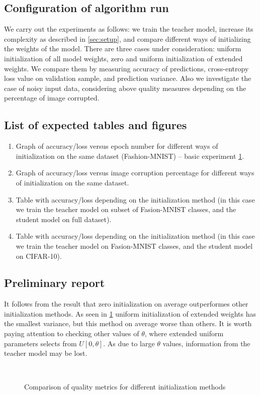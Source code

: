 \documentclass[80pt]{article}
\begin{document}
\subsection{Configuration of algorithm run}

We carry out the experiments as follows: we train the teacher model, increase its complexity as described in \autoref{sec:setup}, and compare different ways of initializing the weights of the model. There are three cases under consideration: uniform initialization of all model weights, zero and uniform initialization of extended weights. We compare them by measuring accuracy of predictions, cross-entropy loss value on validation sample, and prediction variance. Also we investigate the case of noisy input data, considering above quality measures depending on the percentage of image corrupted.

\subsection{List of expected tables and figures}

\begin{enumerate}
    \item Graph of accuracy/loss versus epoch number for different ways of initialization on the same dataset (Fashion-MNIST) -- basic experiment \ref{fig:1}.
    \item Graph of accuracy/loss versus image corruption percentage for different ways of initialization on the same dataset.
    \item Table with accuracy/loss depending on the initialization method (in this case we train the teacher model on subset of Fasion-MNIST classes, and the student model on full dataset).
    \item Table with accuracy/loss depending on the initialization method (in this case we train the teacher model on Fasion-MNIST classes, and the student model on CIFAR-10).
\end{enumerate}

\subsection{Preliminary report}

It follows from the result that zero initialization on average outperformes other initialization methods. As seen in \ref{fig:1} uniform initialization of extended weights has the smallest variance, but this method on average worse than others. It is worth paying attention to checking other values of $\theta$, where extended uniform parameters selects from $U[0, \theta]$. As due to large $\theta$ values, information from the teacher model may be lost.

\begin{figure}[!t]
  \\
 \caption{Comparison of quality metrics for different initialization methods}
  \label{fig:1}
\end{figure}

\newpage



\end{document}
